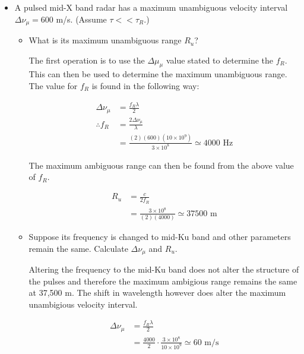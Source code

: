 \documentclass[letterpaper,10pt]{article}\usepackage[]{graphicx}\usepackage[]{color}
\newcommand{\question}[3]{
\begin{itemize}
\item[{\makebox[1cm]{#1)}}] #2

\vspace{.2in}

#3

\end{itemize}

\vspace{.2in}
}
\begin{document}
\question{1.4}
{A pulsed mid-X band radar has a maximum unambiguous velocity interval $\Delta \nu_\mu=600$ m/s. (Assume $\tau << \tau_R$.)}
{

\question{a}{What is its maximum unambiguous range $R_u$?}{
The first operation is to use the $\Delta \mu_\mu$ value stated to determine the $f_R$.  This can then be used to determine the maximum unambiguous range.  The value for $f_R$ is found in the following way:

\begin{align*}
\Delta \nu_\mu & = \frac{f_R \lambda}{2} \\
\therefore f_R & = \frac{2\Delta \nu_\mu}{\lambda} \\
& = \frac{(2)(600)(10\times 10^9)}{3\times 10^8} \simeq 4000 \text{ Hz}
\end{align*}

The maximum ambiguous range can then be found from the above value of $f_R$.

\begin{align*}
R_u & = \frac{c}{2f_R} \\
& = \frac{3\times 10^8}{(2)(4000)} \simeq 37500 \text{ m}
\end{align*}

}

\question{b}{Suppose its frequency is changed to mid-Ku band and other parameters remain the same. Calculate $\Delta \nu_\mu$ and $R_u$.}{

Altering the frequency to the mid-Ku band does not alter the structure of the pulses and therefore the maximum ambigious range remains the same at 37,500 m.  The shift in wavelength however does alter the maximum unambigious velocity interval.

\begin{align*}
\Delta \nu_\mu & = \frac{f_R\lambda}{2} \\
& = \frac{4000}{2}\cdot\frac{3\times 10^8}{10\times 10^9} \simeq 60 \text{ m/s}
\end{align*}

}
}
\end{document}
